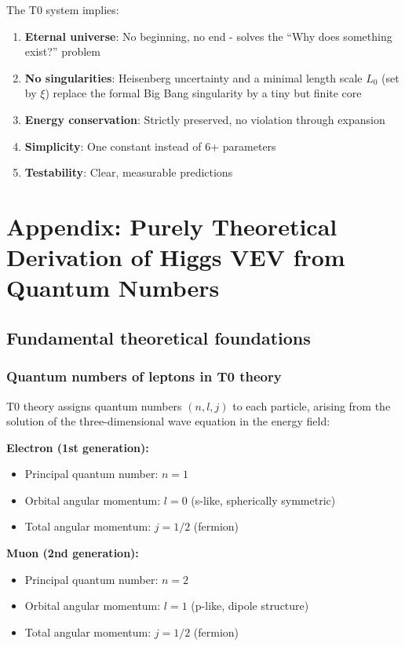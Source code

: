 The T0 system implies:
\begin{enumerate}
	\item \textbf{Eternal universe}: No beginning, no end - solves the ``Why does something exist?'' problem
	\item \textbf{No singularities}: Heisenberg uncertainty and a minimal length scale $L_0$ (set by $\xi$) replace the formal Big Bang singularity by a tiny but finite core
	\item \textbf{Energy conservation}: Strictly preserved, no violation through expansion
	\item \textbf{Simplicity}: One constant instead of 6+ parameters
	\item \textbf{Testability}: Clear, measurable predictions
\end{enumerate}
\section{Appendix: Purely Theoretical Derivation of Higgs VEV from Quantum Numbers}

\subsection{Fundamental theoretical foundations}

\subsubsection{Quantum numbers of leptons in T0 theory}

T0 theory assigns quantum numbers $(n, l, j)$ to each particle, arising from the solution of the three-dimensional wave equation in the energy field:

\textbf{Electron (1st generation):}
\begin{itemize}
	\item Principal quantum number: $n = 1$
	\item Orbital angular momentum: $l = 0$ (s-like, spherically symmetric)
	\item Total angular momentum: $j = 1/2$ (fermion)
\end{itemize}

\textbf{Muon (2nd generation):}
\begin{itemize}
	\item Principal quantum number: $n = 2$
	\item Orbital angular momentum: $l = 1$ (p-like, dipole structure)
	\item Total angular momentum: $j = 1/2$ (fermion)
\end{itemize}

